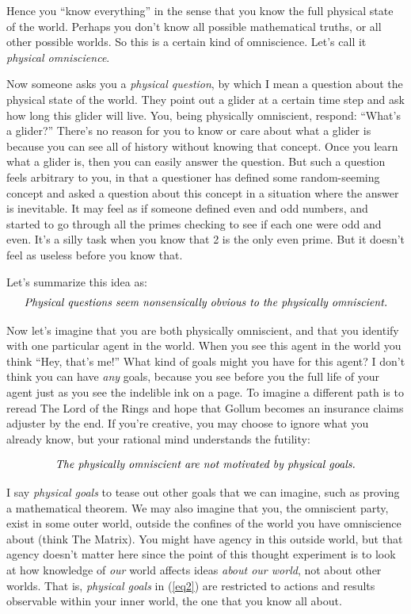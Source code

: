 \documentclass[11pt, oneside]{article}
\theoremstyle{argtstyle}
\begin{document}
Hence you ``know everything'' in the sense that you know the full physical state
of the world. Perhaps you don't know all possible mathematical truths, or all
other possible worlds. So this is a certain kind of omniscience. Let's call it
{\em physical omniscience}.

Now someone asks you a {\em physical question}, by which I mean
a question about the physical state of the world.
They point out a glider at a certain time step and
ask how long this glider will live. You, being physically omniscient,
respond:
``What's a glider?'' There's no reason for you to know or care about what a
glider is because you can see all of history without knowing that concept.
Once you
learn what a glider is, then you can easily answer the question. But such a
question feels arbitrary to you, in that a questioner has defined some
random-seeming concept and asked a question about this concept in a situation
where
the answer is inevitable. It may feel as if someone defined even and odd
numbers, and started to go through all the primes checking to see if each one
were odd and even. It's a silly task when you know that 2 is the only
even prime. But it doesn't feel as useless before you know that.

Let's summarize this idea as:
\begin{equation*}\label{eq1}
    \text{\em Physical questions seem nonsensically obvious to the physically
    omniscient.}
\end{equation*}

Now let's imagine that you are both physically omniscient, and that you identify
with one particular agent in the world.
When you see this agent in the world you
think ``Hey, that's me!'' What kind of goals might you have for this agent? I
don't think you can have {\em any} goals, because you see before you the
full life of your agent just as you see the indelible ink on a page. To imagine
a different path is to reread The Lord of the Rings and hope that Gollum
becomes an insurance claims adjuster by the end. If you're creative, you may
choose to ignore what you already know, but your rational mind understands the
futility:

\begin{equation}\label{eq2}
    \text{\em The physically omniscient are not motivated by
    physical goals.}
\end{equation}
 
I say {\em physical goals} to tease out other goals that we can imagine, such as
proving a mathematical theorem. We may also imagine that you, the omniscient
party, exist in some outer world, outside the confines of the world you have
omniscience about (think The Matrix).
You might have agency in this outside world, but that agency doesn't matter here
since the point of this thought
experiment is to look at how knowledge of {\em our} world affects ideas {\em
about our world}, not about other worlds.
That is, {\em physical goals} in (\ref{eq2})
are restricted to actions and results observable
within your inner world, the one that you know all about.
\end{document}
